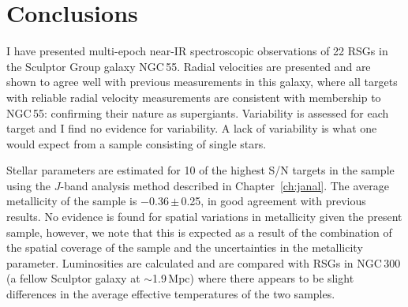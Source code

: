 


\section{Conclusions} %
\label{sec:ngc55conc}

I have presented multi-epoch near-IR spectroscopic observations of 22 RSGs in the Sculptor Group galaxy NGC\,55.
Radial velocities are presented and are shown to agree well with previous measurements in this galaxy, where all targets with reliable radial velocity measurements are consistent with membership to NGC\,55: confirming their nature as supergiants.
Variability is assessed for each target and I find no evidence for variability. A lack of variability is what one would expect from a sample consisting of single stars.

Stellar parameters are estimated for 10 of the highest S/N targets in the sample using the $J$-band analysis method described in Chapter~\ref{ch:janal}.
The average metallicity of the sample is $-$0.36\,$\pm$\,0.25, in good agreement with previous results.
No evidence is found for spatial variations in metallicity given the present sample, however, we note that this is expected as a result of the combination of the spatial coverage of the sample and the uncertainties in the metallicity parameter.
Luminosities are calculated and are compared with RSGs in NGC\,300 (a fellow Sculptor galaxy at $\sim$1.9\,Mpc) where there appears to be slight differences in the average effective temperatures of the two samples.



% 